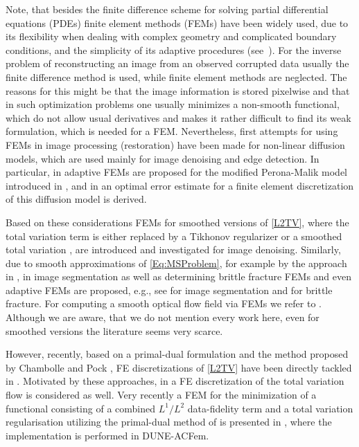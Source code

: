 \documentclass[enabledeprecatedfontcommands,cleardoublepage=empty,headsepline,twoside,11pt,DIV=15,BCOR=12mm,final]{scrartcl}
\begin{document}
Note, that besides the finite difference scheme for solving partial differential equations (PDEs) finite element methods (FEMs) have been widely used, due to its flexibility when dealing with complex geometry and complicated boundary conditions, and the simplicity of its adaptive procedures (see~\cite{NoSiVe:09}). For the inverse problem of reconstructing an image from an observed corrupted data usually the finite difference method is used, while finite element methods are neglected. The reasons for this might be that the image information is stored pixelwise and that in such optimization problems one usually minimizes a non-smooth functional, which do not allow usual derivatives and makes it rather difficult to find its weak formulation, which is needed for a FEM. Nevertheless, first attempts for using FEMs in image processing (restoration) have been made for non-linear diffusion models, which are used mainly for image denoising and edge detection. In particular, in \cite{BazBlo, BaeMik, PreRum} adaptive FEMs are proposed for the modified Perona-Malik model introduced in \cite{CatLioMorCol}, and in \cite{Li} an optimal error estimate for a finite element discretization of this diffusion model is derived.

Based on these considerations FEMs for smoothed versions of \eqref{L2TV}, where the total variation term is either replaced by a Tikhonov regularizer \cite{Lam} or a smoothed total variation \cite{DesJaoSel, Yao}, are introduced and investigated for image denoising. Similarly, due to smooth approximations of \eqref{Eq:MSProblem}, for example by the approach in \cite{AmbTor}, in image segmentation as well as determining brittle fracture FEMs and even adaptive FEMs are proposed, e.g., see \cite{ChaBou, FenPoh, DogMorNoc} for image segmentation and \cite{BurOrtSue2010,BurOrtSue2013,ArtForMicPer} for brittle fracture. For computing a smooth optical flow field via FEMs we refer to \cite{BelHec2011,BelHec2016,LehTur}. Although we are aware, that we do not mention every work here, even for smoothed versions the literature seems very scarce.

However, recently, based on a primal-dual formulation and the method proposed by Chambolle and Pock \cite{ChaPoc}, FE discretizations of \eqref{L2TV} have been directly tackled in \cite{Bar2012, Bar2013, TiaYua}. Motivated by these approaches, in \cite{BarNocSal} a FE discretization of the total variation flow is considered as well. 
Very recently a FEM for the minimization of a functional consisting of a combined $L^1/L^2$ data-fidelity term and a total variation regularisation utilizing the primal-dual method of \cite{ChaPoc} is presented in \cite{AlkLan}, where the implementation is performed in DUNE-ACFem.
\end{document}
